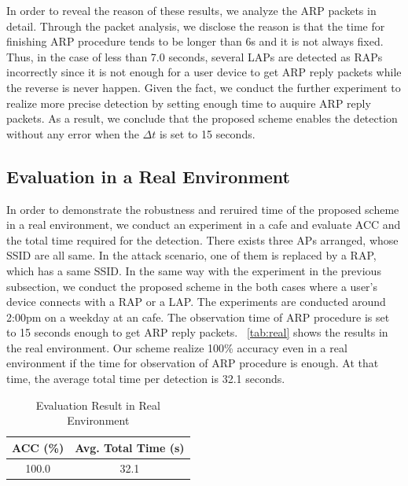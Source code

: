 \documentclass[conference]{IEEEtran}
\begin{document}
In order to reveal the reason of these results, we analyze the ARP packets in detail.
Through the packet analysis, we disclose the reason is that the time for finishing ARP procedure tends to be longer than 6s and it is not always fixed.
Thus, in the case of less than 7.0 seconds, several LAPs are detected as RAPs incorrectly since it is not enough for a user device to get ARP reply packets while the reverse is never happen.
Given the fact, we conduct the further experiment to realize more precise detection by setting enough time to auquire ARP reply packets.
As a result, we conclude that the proposed scheme enables the detection without any error when the $\Delta t$ is set to 15 seconds.

\subsection{Evaluation in a Real Environment}
In order to demonstrate the robustness and reruired time of the proposed scheme in a real environment, we conduct an experiment in a cafe and evaluate ACC and the total time required for the detection.
There exists three APs arranged, whose SSID are all same.
In the attack scenario, one of them is replaced by a RAP, which has a same SSID.
In the same way with the experiment in the previous subsection, we conduct the proposed scheme in the both cases where a user's device connects with a RAP or a LAP.
The experiments are conducted around 2:00pm on a weekday at an cafe.
The observation time of ARP procedure is set to 15 seconds enough to get ARP reply packets.
\tablename~\ref{tab:real} shows the results in the real environment.
Our scheme realize 100\% accuracy even in a real environment if the time for observation of ARP procedure is enough.
At that time, the average total time per detection is 32.1 seconds.

\begin{table}[htb] 
    \begin{center}
        \caption{Evaluation Result in Real Environment}
        \begin{tabular}{c c} \hline
            ACC (\%) & Avg. Total Time (s) \\ \hline \hline
            100.0 & 32.1 \\ \hline
        \end{tabular}
    \end{center}
\end{table}
\end{document}
